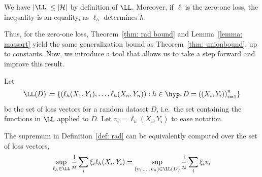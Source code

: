 \documentclass[reqno]{amsart}
\begin{document}
\begin{fact}\label{fact: L H}
  We have $\vert\LL\vert \le \card$ by definition of $\LL$. Moreover, if $\ell$ is the zero-one loss, the inequality is an equality, as $\ell_h$ determines $h$. 
\end{fact}

Thus, for the zero-one loss, Theorem~\ref{thm: rad bound} and Lemma~\ref{lemma: massart} yield the same generalization bound as Theorem~\ref{thm: unionbound}, up to constants. Now, we introduce a tool that allows us to take a step forward and improve this result. 

Let \[\LL(D) \coloneq \left\{\left(\ell_h(X_1,Y_1),\ldots,\ell_h(X_n,Y_n)\right): h \in \hyp, D = {((X_i, Y_i))}_{i=1}^n \right\}\] be the set of loss vectors for a random dataset $D$, i.e.\ the set containing the functions in $\LL$ applied to $D$. Let $v_i = \ell_h(X_i,Y_i)$ to ease notation. 

The supremum in Definition~\ref{def: rad} can be equivalently computed over the set of loss vectors,
\[
\sup_{\ell_h\in\LL} \frac{1}{n}\sum_i \xi_i \ell_h(X_i,Y_i) = \sup_{(v_1,\ldots,v_n)\in\LL(D)} \frac{1}{n}\sum_i \xi_i v_i
\]
\end{document}
